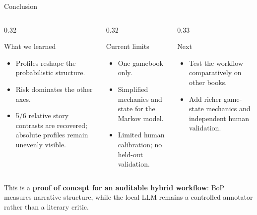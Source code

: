 \documentclass{beamer}
\newcommand{\imp}[1]{\textbf{\color{cyan}#1}}
\begin{document}
	\begin{frame}{Conclusion}
		
		\begin{columns}[T,onlytextwidth]
			
			\begin{column}{0.32\textwidth}
				\begin{block}{What we learned}
					\scriptsize
					\begin{itemize}
						\setlength{\itemsep}{1pt}
						\item Profiles reshape the probabilistic structure.
						\item Risk dominates the other axes.
						\item 5/6 relative story contrasts are recovered; absolute profiles
						remain unevenly visible.
					\end{itemize}
				\end{block}
			\end{column}
			
			\begin{column}{0.32\textwidth}
				\begin{alertblock}{Current limits}
					\scriptsize
					\begin{itemize}
						\setlength{\itemsep}{1pt}
						\item One gamebook only.
						\item Simplified mechanics and state for the Markov model.
						\item Limited human calibration; no held-out validation.
					\end{itemize}
				\end{alertblock}
			\end{column}
			
			\begin{column}{0.33\textwidth}
				\begin{exampleblock}{Next}
					\scriptsize
					\begin{itemize}
						\setlength{\itemsep}{1pt}
						\item Test the workflow comparatively on other books.
						\item Add richer game-state mechanics and independent human validation.
					\end{itemize}
					
				\end{exampleblock}
			\end{column}
			
		\end{columns}
		
		\vspace{0.15cm}
		{\footnotesize
			This is a \imp{proof of concept for an auditable hybrid workflow}:
			BoP measures narrative structure, while the local LLM remains a
			controlled annotator rather than a literary critic.
		}
		
	\end{frame}
	
\end{document}
